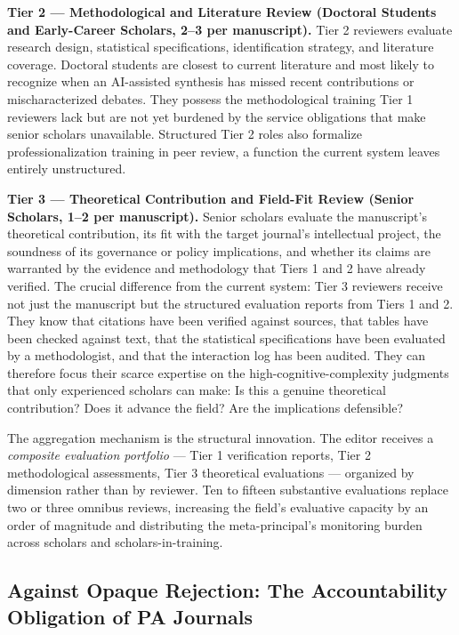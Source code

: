 \documentclass[12pt]{article}
\begin{document}
\textbf{Tier 2 --- Methodological and Literature Review (Doctoral Students and Early-Career
Scholars, 2--3 per manuscript).}
Tier 2 reviewers evaluate research design, statistical specifications, identification
strategy, and literature coverage. Doctoral students are closest to current literature and
most likely to recognize when an AI-assisted synthesis has missed recent contributions or
mischaracterized debates. They possess the methodological training Tier 1 reviewers lack
but are not yet burdened by the service obligations that make senior scholars unavailable.
Structured Tier 2 roles also formalize professionalization training in peer review,
a function the current system leaves entirely unstructured.

\textbf{Tier 3 --- Theoretical Contribution and Field-Fit Review (Senior Scholars,
1--2 per manuscript).}
Senior scholars evaluate the manuscript's theoretical contribution, its fit with the target
journal's intellectual project, the soundness of its governance or policy implications, and
whether its claims are warranted by the evidence and methodology that Tiers 1 and 2 have
already verified. The crucial difference from the current system: Tier 3 reviewers receive
not just the manuscript but the structured evaluation reports from Tiers 1 and 2. They know
that citations have been verified against sources, that tables have been checked against
text, that the statistical specifications have been evaluated by a methodologist, and that
the interaction log has been audited. They can therefore focus their scarce expertise on the
high-cognitive-complexity judgments that only experienced scholars can make: Is this a genuine
theoretical contribution? Does it advance the field? Are the implications defensible?

The aggregation mechanism is the structural innovation. The editor receives a
\emph{composite evaluation portfolio} --- Tier 1 verification reports, Tier 2 methodological
assessments, Tier 3 theoretical evaluations --- organized by dimension rather than by
reviewer. Ten to fifteen substantive evaluations replace two or three omnibus reviews,
increasing the field's evaluative capacity by an order of magnitude and distributing the
meta-principal's monitoring burden across scholars and scholars-in-training.

\subsection{Against Opaque Rejection: The Accountability Obligation of PA Journals}
\end{document}
